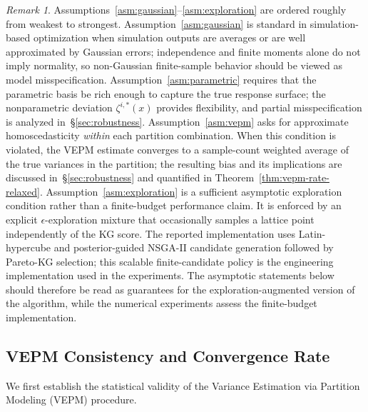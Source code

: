 \documentclass[12pt]{article}
\theoremstyle{plain}
\theoremstyle{definition}
\theoremstyle{remark}
\newtheorem{remark}{Remark}[section]
\begin{document}
\begin{remark}\label{rem:assumptions}
Assumptions~\ref{asm:gaussian}--\ref{asm:exploration} are ordered roughly
from weakest to strongest.  Assumption~\ref{asm:gaussian} is standard in
simulation-based optimization when simulation outputs are averages or
are well approximated by Gaussian errors; independence and finite
moments alone do not imply normality, so non-Gaussian finite-sample
behavior should be viewed as model misspecification.
Assumption~\ref{asm:parametric} requires that the parametric basis be rich
enough to capture the true response surface; the nonparametric deviation
$\zeta^{i,*}(x)$ provides flexibility, and partial misspecification is
analyzed in~\S\ref{sec:robustness}.
Assumption~\ref{asm:vepm} asks for approximate homoscedasticity \emph{within}
each partition combination.  When this condition is violated, the VEPM
estimate converges to a sample-count weighted average of the true variances
in the partition; the resulting bias and its implications are discussed
in~\S\ref{sec:robustness} and quantified in Theorem~\ref{thm:vepm-rate-relaxed}.
Assumption~\ref{asm:exploration} is a sufficient asymptotic exploration
condition rather than a finite-budget performance claim.  It is enforced
by an explicit $\epsilon$-exploration mixture that occasionally samples a
lattice point independently of the KG score.  The reported implementation
uses Latin-hypercube and posterior-guided NSGA-II candidate generation
followed by Pareto-KG selection; this scalable finite-candidate policy is
the engineering implementation used in the experiments.  The asymptotic
statements below should therefore be read as guarantees for the
exploration-augmented version of the algorithm, while the numerical
experiments assess the finite-budget implementation.
\end{remark}

\subsection{VEPM Consistency and Convergence Rate}\label{sec:vepm-theory}

We first establish the statistical validity of the Variance Estimation via
Partition Modeling (VEPM) procedure.
\end{document}
